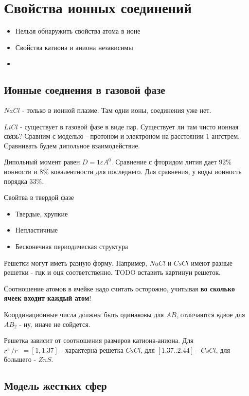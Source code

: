 \documentclass[11pt]{article}
\begin{document}
\section*{Свойства ионных соединений}

\begin{itemize}
\item Нельзя обнаружить свойства атома в ионе
\item Свойства катиона и аниона независимы
\item 
\end{itemize}

\subsection*{Ионные соеднения в газовой фазе}

$NaCl$ - только в ионной плазме. Там одни ионы, соединения уже нет.

$LiCl$ - существует в газовой фазе в виде пар. Существует ли там чисто ионная связь? Сравним с моделью - протоном и электроном на расстоянии 1 ангстрем. Сравнивать будем дипольное взаимодействие.

Дипольный момент равен $D = 1 \varepsilon A^0$. Сравнение с фторидом лития дает 92\% ионности и 8\% ковалентности для последнего. Для сравнения, у воды ионность порядка 33\%.

Свойтва в твердой фазе

\begin{itemize}
\item Твердые, хрупкие
\item Непластичные
\item Бесконечная периодическая структура
\end{itemize}

Решетки могут иметь разную форму. Например, $NaCl$ и $CsCl$ имеют разные решетки - гцк и оцк соответственно.
TODO вставить картинуи решеток.

Соотношение атомов в ячейке надо считать осторожно, учитывая \textbf{во сколько ячеек входит каждый атом}!

Координационные числа должны быть одинаковы для $AB$, отличаются вдвое для $AB_2$ - ну, иначе не сойдется.

Решетка зависит от соотношения размеров катиона-аниона. Для $r^+/r^- = [1, 1.37]$ - характерна решетка $CsCl$, для $[1.37..2.44]$ - $CsCl$, для большего - $ZnS$.

\subsection*{Модель жестких сфер}
\end{document}
